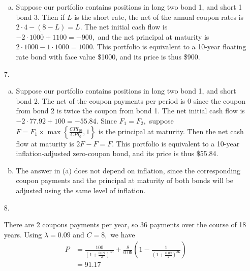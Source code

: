 \documentclass{article}
\begin{document}
\begin{enumerate}
\begin{enumerate}[(a)]
			\item 
				\begin{soln}
					Suppose our portfolio contains positions in long two bond 1, and short 1 bond 3. Then if $L$ is the short rate, the net of the annual coupon rates is $2\cdot 4 - (8-L) = L.$ The net initial cash flow is $-2\cdot 1000 + 1100 = -900,$ and the net principal at maturity is $2\cdot 1000 - 1\cdot 1000 = 1000.$ This portfolio is equivalent to a 10-year floating rate bond with face value \$1000, and its price is thus \$900.
				\end{soln}
				
		\end{enumerate}

	\item[7.]
		\begin{enumerate}[(a)]
			\item 
				\begin{soln}
					Suppose our portfolio contains positions in long two bond 1, and short bond 2. The net of the coupon payments per period is 0 since the coupon from bond 2 is twice the coupon from bond 1. The net initial cash flow is $-2\cdot 77.92 + 100 = -55.84.$ Since $F_1=F_2,$ suppose $F=F_1\times\max\left\{ \frac{CPI_{20}}{CPI_0}, 1 \right\}$ is the principal at maturity. Then the net cash flow at maturity is $2F-F=F.$ This portfolio is equivalent to a 10-year inflation-adjusted zero-coupon bond, and its price is thus \$55.84.
				\end{soln}

			\item
				\begin{soln}
					The answer in (a) does not depend on inflation, since the corresponding coupon payments and the principal at maturity of both bonds will be adjusted using the same level of inflation.
				\end{soln}
				
		\end{enumerate}

	\item[8.]
		\begin{soln}
			There are 2 coupons payments per year, so 36 payments over the course of 18 years. Using $\lambda=0.09$ and $C=8,$ we have
			\begin{align*}
				P &= \frac{100}{\left( 1+\frac{0.09}{2} \right)^{36}} + \frac{8}{0.09}\left( 1-\frac{1}{\left( 1+\frac{0.09}{2} \right)^{36}} \right) \\
				&= 91.17
			\end{align*}
		\end{soln}


\end{enumerate}
\end{document}
